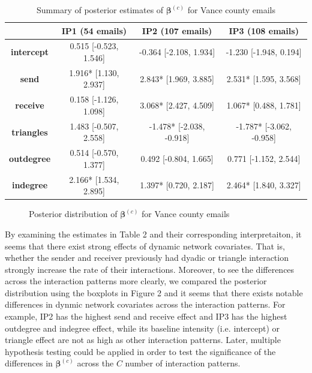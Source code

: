 \documentclass[a4paper]{article}
\begin{document}
 \begin{table}[ht]
 	\centering
 	\begin{tabular}{|c|c|c|c|} 
 		\hline
 		& \textbf{IP1} (54 emails) & \textbf{IP2} (107 emails) &\textbf{IP3} (108 emails) \\
 		\hline
 		\textbf{intercept} & 0.515 [-0.523, 1.546]& -0.364 [-2.108, 1.934]& -1.230 [-1.948, 0.194]\\
 		\textbf{send}&  1.916* [1.130, 2.937]& 2.843* [1.969, 3.885]& 2.531* [1.595, 3.568]\\
 		\textbf{receive}& 0.158 [-1.126, 1.098]& 3.068* [2.427, 4.509]& 1.067* [0.488, 1.781]\\
 		\textbf{triangles} & 1.483 [-0.507, 2.558]& -1.478* [-2.038, -0.918]& -1.787* [-3.062, -0.958]\\
 		\textbf{outdegree} & 0.514 [-0.570, 1.377]& 0.492 [-0.804, 1.665]& 0.771 [-1.152, 2.544]\\
 		\textbf{indegree} & 2.166* [1.534, 2.895]& 1.397* [0.720, 2.187]& 2.464* [1.840, 3.327]\\
 		\hline
 	\end{tabular}
 	\caption {Summary of posterior estimates of $\boldsymbol{\beta}^{(c)}$ for Vance county emails}
 	\label{table:Vancebeta}
 \end{table}
 \begin{figure}[ht]
 	\centering
 	\caption{Posterior distribution of  $\boldsymbol{\beta}^{(c)}$ for Vance county emails}
 	\label{fig:Vanceboxplot}
 \end{figure}
 By examining the estimates in Table 2 and their corresponding interpretaiton, it seems that there exist strong effects of dynamic network covariates. That is, whether the sender and receiver previously had dyadic or triangle interaction strongly increase the rate of their interactions. Moreover, to see the differences across the interaction patterns more clearly, we compared the posterior distribution using the boxplots in Figure 2 and it seems that there exists notable differences in dynmic network covariates across the interaction patterns. For example, IP2 has the highest send and receive effect and IP3 has the highest outdegree and indegree effect, while its baseline intensity (i.e. intercept) or triangle effect are not as high as other interaction patterns. Later, multiple hypothesis testing could be applied in order to test the significance of the differences in  $\boldsymbol{\beta}^{(c)}$ across the $C$ number of interaction patterns.\\\newline
\end{document}

